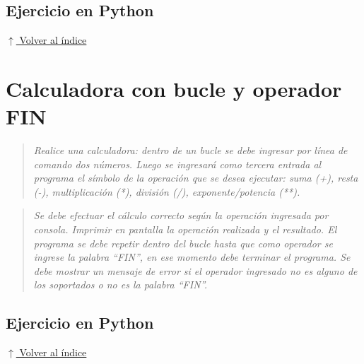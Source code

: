 \documentclass[12pt]{article}
\newcommand{\codigopython}[2]{%
}
\newcommand{\volverindice}{%
    \vspace{1em}%
    \begin{flushright}%
        \hyperlink{indice}{\small $\uparrow$ Volver al índice}%
    \end{flushright}%
}
\newcommand{\enunciado}[1]{%
    \begin{quote}
        \itshape #1
    \end{quote}
}
\begin{document}
\subsection*{Ejercicio en Python}

\codigopython{29}{Cantidad y sumatoria de números en un rango}

\volverindice
\newpage


\section{Calculadora con bucle y operador FIN}

\enunciado{Realice una calculadora: dentro de un bucle se debe ingresar por línea de comando dos números. Luego se ingresará como tercera entrada al programa el símbolo de la operación que se desea ejecutar: suma (+), resta (-), multiplicación (*), división (/), exponente/potencia (**).}

\enunciado{Se debe efectuar el cálculo correcto según la operación ingresada por consola. Imprimir en pantalla la operación realizada y el resultado. El programa se debe repetir dentro del bucle hasta que como operador se ingrese la palabra \enquote{FIN}, en ese momento debe terminar el programa. Se debe mostrar un mensaje de error si el operador ingresado no es alguno de los soportados o no es la palabra \enquote{FIN}.}

\subsection*{Ejercicio en Python}

\codigopython{30}{Calculadora con bucle y operador FIN}

\volverindice
\end{document}
